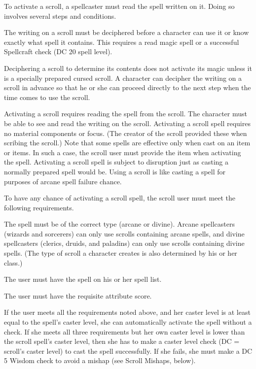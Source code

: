  To activate a scroll, a spellcaster must read the spell written on it. Doing so involves several steps and conditions.

 The writing on a scroll must be deciphered before a character can use it or know exactly what spell it contains. This requires a read magic spell or a successful Spellcraft check (DC 20 \add spell level).

Deciphering a scroll to determine its contents does not activate its magic unless it is a specially prepared cursed scroll. A character can decipher the writing on a scroll in advance so that he or she can proceed directly to the next step when the time comes to use the scroll.

 Activating a scroll requires reading the spell from the scroll. The character must be able to see and read the writing on the scroll. Activating a scroll spell requires no material components or focus. (The creator of the scroll provided these when scribing the scroll.) Note that some spells are effective only when cast on an item or items. In such a case, the scroll user must provide the item when activating the spell. Activating a scroll spell is subject to disruption just as casting a normally prepared spell would be. Using a scroll is like casting a spell for purposes of arcane spell failure chance.

To have any chance of activating a scroll spell, the scroll user must meet the following requirements.
\begin{itemize*}
\item The spell must be of the correct type (arcane or divine). Arcane spellcasters (wizards and sorcerers) can only use scrolls containing arcane spells, and divine spellcasters (clerics, druids, and paladins) can only use scrolls containing divine spells. (The type of scroll a character creates is also determined by his or her class.)
\item The user must have the spell on his or her spell list.
\item The user must have the requisite attribute score.
\end{itemize*}

If the user meets all the requirements noted above, and her caster level is at least equal to the spell's caster level, she can automatically activate the spell without a check. If she meets all three requirements but her own caster level is lower than the scroll spell's caster level, then she has to make a caster level check (DC = scroll's caster level) to cast the spell successfully. If she fails, she must make a DC 5 Wisdom check to avoid a mishap (see Scroll Mishaps, below).

